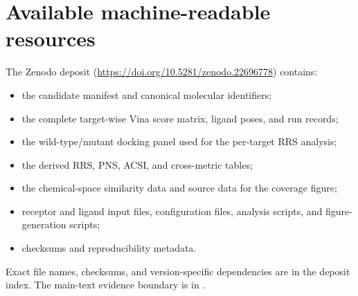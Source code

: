 \documentclass[journal=jcisd8,manuscript=suppinfo]{achemso}
\begin{document}
\section{Available machine-readable resources}\label{sec:sm_resources}
The Zenodo deposit (\url{https://doi.org/10.5281/zenodo.22696778}) contains:
\begin{itemize}
    \item the candidate manifest and canonical molecular identifiers;
    \item the complete target-wise Vina score matrix, ligand poses, and run records;
    \item the wild-type/mutant docking panel used for the per-target RRS analysis;
    \item the derived RRS, PNS, ACSI, and cross-metric tables;
    \item the chemical-space similarity data and source data for the coverage figure;
    \item receptor and ligand input files, configuration files, analysis scripts, and figure-generation scripts;
    \item checksums and reproducibility metadata.
\end{itemize}
Exact file names, checksums, and version-specific dependencies are in the deposit index. The main-text evidence boundary is in .


\end{document}

